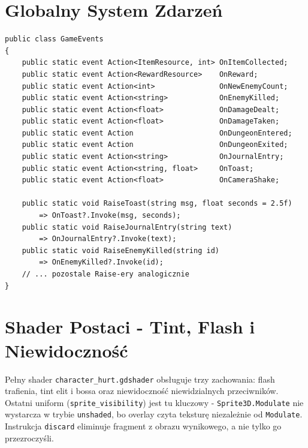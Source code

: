 \section{Globalny System Zdarzeń}

\begin{lstlisting}[caption={GameEvents.cs - wybrane zdarzenia},label={lst:events}]
public class GameEvents
{
    public static event Action<ItemResource, int> OnItemCollected;
    public static event Action<RewardResource>    OnReward;
    public static event Action<int>               OnNewEnemyCount;
    public static event Action<string>            OnEnemyKilled;
    public static event Action<float>             OnDamageDealt;
    public static event Action<float>             OnDamageTaken;
    public static event Action                    OnDungeonEntered;
    public static event Action                    OnDungeonExited;
    public static event Action<string>            OnJournalEntry;
    public static event Action<string, float>     OnToast;
    public static event Action<float>             OnCameraShake;

    public static void RaiseToast(string msg, float seconds = 2.5f)
        => OnToast?.Invoke(msg, seconds);
    public static void RaiseJournalEntry(string text)
        => OnJournalEntry?.Invoke(text);
    public static void RaiseEnemyKilled(string id)
        => OnEnemyKilled?.Invoke(id);
    // ... pozostale Raise-ery analogicznie
}
\end{lstlisting}

\section{Shader Postaci - Tint, Flash i Niewidoczność}

Pełny shader \texttt{character\_\allowbreak hurt.\allowbreak gdshader} obsługuje trzy zachowania: flash trafienia, tint elit i bossa oraz niewidoczność niewidzialnych przeciwników. Ostatni uniform (\texttt{sprite\_\allowbreak visibility}) jest tu kluczowy - \texttt{Sprite3D.\allowbreak Modulate} nie wystarcza w trybie \texttt{unshaded}, bo overlay czyta teksturę niezależnie od \texttt{Modulate}. Instrukcja \texttt{discard} eliminuje fragment z obrazu wynikowego, a nie tylko go przezroczyśli.

